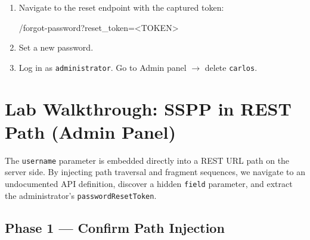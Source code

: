 \documentclass[11pt]{article}
\begin{document}
\begin{enumerate}
  \item Navigate to the reset endpoint with the captured token:
\begin{httpbox}[]
/forgot-password?reset_token=<TOKEN>
\end{httpbox}
  \item Set a new password.
  \item Log in as \texttt{administrator}. Go to Admin panel $\to$ delete \texttt{carlos}.
\end{enumerate}

\section{Lab Walkthrough: SSPP in REST Path (Admin Panel)}

\begin{notebox}[Scenario]
The \texttt{username} parameter is embedded directly into a REST URL path on the server side. By injecting path traversal and fragment sequences, we navigate to an undocumented API definition, discover a hidden \texttt{field} parameter, and extract the administrator's \texttt{passwordResetToken}.
\end{notebox}

\subsection{Phase 1 --- Confirm Path Injection}
\end{document}
